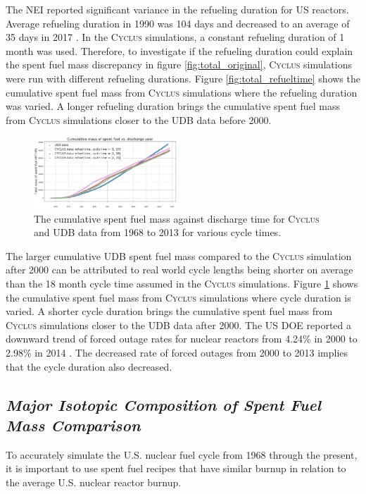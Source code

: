 \documentclass{anstrans}
\newcommand{\Cyclus}{\textsc{Cyclus}\xspace}%
\begin{document}
The \gls{NEI} reported significant variance in the refueling duration for \gls{US} reactors. Average 
refueling duration in 1990 was 104 days and decreased to an average of 35 days in 2017 \cite{iaea_current_nodate}. In the \Cyclus simulations, a constant refueling duration of 1 month was 
used. Therefore, to investigate if the refueling duration could explain the spent fuel mass discrepancy in figure \ref{fig:total_original}, \Cyclus simulations were run with different refueling durations.
Figure \ref{fig:total_refueltime} shows the cumulative spent fuel mass from \Cyclus simulations where 
the refueling duration was varied. A longer refueling duration brings the cumulative spent fuel mass 
from \Cyclus simulations closer to the \gls{UDB} data before 2000.

\begin{figure}[b] %
	\centering
	\includegraphics[width=0.48\textwidth]{../figures/cumulative_mass_udb_cyclus_cycletime}
	\caption{The cumulative spent fuel mass against discharge time for \Cyclus and \gls{UDB} data from 1968 to 2013 for various cycle times.}
	\label{fig:total_cycletime}
\end{figure} 

The larger cumulative \gls{UDB} spent fuel mass compared to the \Cyclus simulation 
after 2000 can be attributed to real world cycle lengths being shorter on 
average than the 18 month cycle time assumed in the \Cyclus simulations. 
Figure \ref{fig:total_cycletime} shows the cumulative spent fuel mass from 
\Cyclus simulations where cycle duration is varied. A shorter cycle duration brings the 
cumulative spent fuel mass from \Cyclus simulations closer to the \gls{UDB} data after 
2000. The \gls{US} \gls{DOE} reported a downward trend of forced outage 
rates for nuclear reactors from 4.24\%  in 2000 to 2.98\% in 2014 \cite{gehin_nuclear_2016}. 
The decreased rate of forced outages from 2000 to 2013 implies that the cycle duration also 
decreased. 

\subsection{\textit{Major Isotopic Composition of  Spent Fuel Mass Comparison}}
To accurately simulate the U.S. nuclear fuel cycle from 1968 through the present, 
it is important to use spent fuel recipes that have similar burnup in relation to 
the average U.S. nuclear reactor burnup. 
\end{document}
